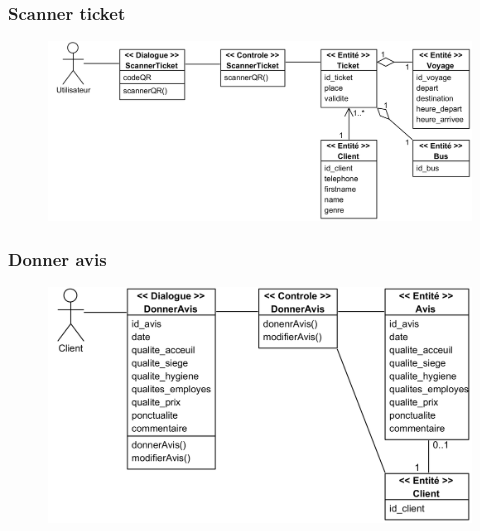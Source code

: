         \subsubsection[Scanner ticket]{Scanner ticket}
            \begin{figure}[H]
                \centering
                \includegraphics[width=130mm]{images/diagrammes-de-classes-participantes/scanner-ticket Class Diagram.png}
                \label{fig:cpScannerTicket}
            \end{figure}
        \subsubsection[Donner avis]{Donner avis}
            \begin{figure}[H]
                \centering
                \includegraphics[width=130mm]{images/diagrammes-de-classes-participantes/donner-avis Class Diagram.png}
                \label{fig:cpDonnerAvis}
            \end{figure}
